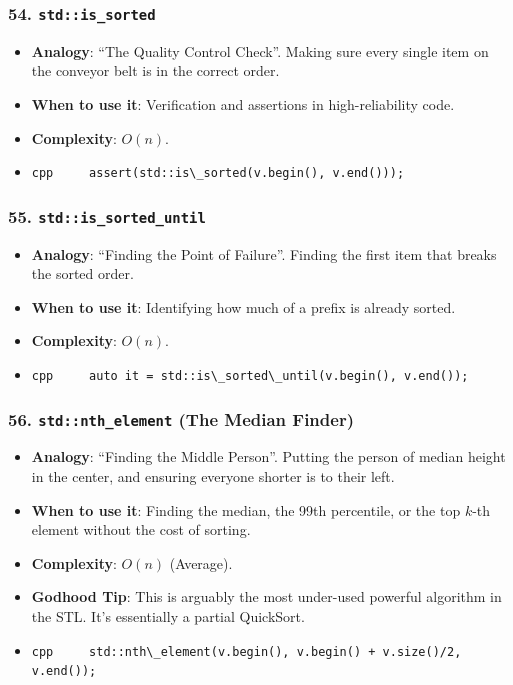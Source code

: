 \hypertarget{stdis_sorted}{%
\subsubsection{\texorpdfstring{54.
\texttt{std::is\_sorted}}{54. std::is\_sorted}}\label{stdis_sorted}}

\begin{itemize}
\tightlist
\item
  \textbf{Analogy}: ``The Quality Control Check''. Making sure every
  single item on the conveyor belt is in the correct order.
\item
  \textbf{When to use it}: Verification and assertions in
  high-reliability code.
\item
  \textbf{Complexity}: \(O(n)\).
\item
  \passthrough{\lstinline!cpp     assert(std::is\_sorted(v.begin(), v.end()));!}
\end{itemize}

\hypertarget{stdis_sorted_until}{%
\subsubsection{\texorpdfstring{55.
\texttt{std::is\_sorted\_until}}{55. std::is\_sorted\_until}}\label{stdis_sorted_until}}

\begin{itemize}
\tightlist
\item
  \textbf{Analogy}: ``Finding the Point of Failure''. Finding the first
  item that breaks the sorted order.
\item
  \textbf{When to use it}: Identifying how much of a prefix is already
  sorted.
\item
  \textbf{Complexity}: \(O(n)\).
\item
  \passthrough{\lstinline!cpp     auto it = std::is\_sorted\_until(v.begin(), v.end());!}
\end{itemize}

\hypertarget{stdnth_element-the-median-finder}{%
\subsubsection{\texorpdfstring{56. \texttt{std::nth\_element} (The
Median
Finder)}{56. std::nth\_element (The Median Finder)}}\label{stdnth_element-the-median-finder}}

\begin{itemize}
\tightlist
\item
  \textbf{Analogy}: ``Finding the Middle Person''. Putting the person of
  median height in the center, and ensuring everyone shorter is to their
  left.
\item
  \textbf{When to use it}: Finding the median, the 99th percentile, or
  the top \(k\)-th element without the cost of sorting.
\item
  \textbf{Complexity}: \(O(n)\) (Average).
\item
  \textbf{Godhood Tip}: This is arguably the most under-used powerful
  algorithm in the STL. It's essentially a partial QuickSort.
\item
  \passthrough{\lstinline!cpp     std::nth\_element(v.begin(), v.begin() + v.size()/2, v.end());!}
\end{itemize}

